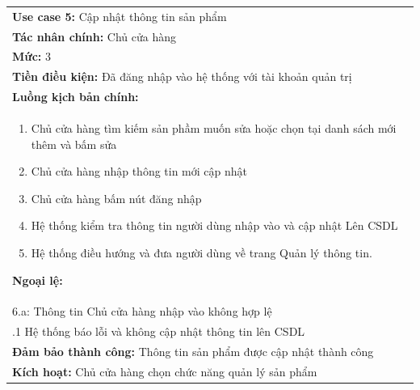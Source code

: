 \begin{center}
	\begin{tabularx}{\linewidth}{|X|}
		\cline{1-2}
		\textbf{Use case 5:} Cập nhật thông tin sản phẩm                          \\
		\textbf{Tác nhân chính:} Chủ cửa hàng                                     \\
		\textbf{Mức:} 3                                                           \\
		\textbf{Tiền điều kiện:} Đã đăng nhập vào hệ thống với tài khoản quản trị \\
		\textbf{Luồng kịch bản chính:}                                            \\
		\begin{enumerate}
			\vspace{-2em}
			\itemsep-0.5em
			\item Chủ cửa hàng tìm kiếm sản phầm muốn sửa hoặc chọn tại danh sách mới thêm và bấm sửa
			\item Chủ cửa hàng nhập thông tin mới cập nhật
			\item Chủ cửa hàng bấm nút đăng nhập
			\item Hệ thống kiểm tra thông tin người dùng nhập vào và cập nhật Lên CSDL
			\item Hệ thống điều hướng và đưa người dùng về trang Quản lý thông tin.
			      \vspace{-1em}
		\end{enumerate}
		\textbf{Ngoại lệ:}                                                        \\
		\hspace{1em}6.a: Thông tin Chủ cửa hàng nhập vào không hợp lệ             \\
		\hspace{2.5em}.1 Hệ thống báo lỗi và không cập nhật thông tin lên CSDL    \\
		\textbf{Đảm bảo thành công:} Thông tin sản phẩm được cập nhật thành công  \\
		\textbf{Kích hoạt:} Chủ cửa hàng chọn chức năng quản lý sản phẩm
		\cline{1-2}
	\end{tabularx}
\end{center}
\newpage

